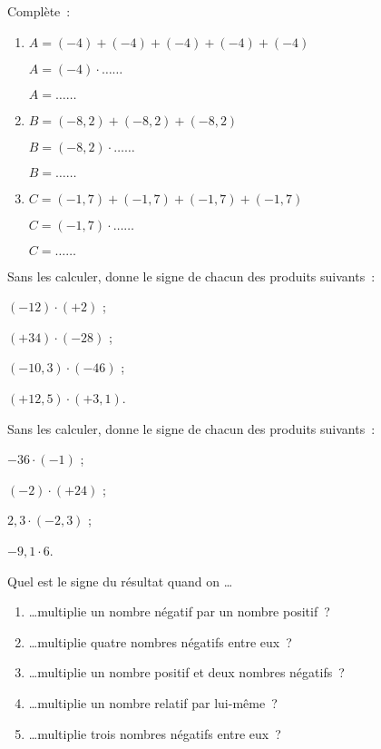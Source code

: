 

\begin{exercice}
Complète : 
\begin{enumerate}
 \item $A = (-4) + (-4) + (-4) + (-4) + (-4)$
 
$A = (-4) \cdot \ldots \ldots$

$A = \ldots \ldots$
 \item $B = (-8,2) + (-8,2) + (-8,2)$
 
$B = (-8,2) \cdot \ldots \ldots$

$B = \ldots \ldots$
 \item $C = (-1,7) + (-1,7) + (-1,7) + (-1,7)$

$C = (-1,7) \cdot \ldots \ldots$

$C = \ldots \ldots$
 \end{enumerate}
\end{exercice}


\begin{exercice}
Sans les calculer, donne le signe de chacun des produits suivants :
\begin{colenumerate}{2}
 \item $(-12) \cdot (+2)$ ;
 \item $(+34) \cdot (-28)$ ;
 \item $(-10,3) \cdot (-46)$ ;
 \item $(+12,5) \cdot (+3,1)$.
 \end{colenumerate}
\end{exercice}


\begin{exercice}
Sans les calculer, donne le signe de chacun des produits suivants :
\begin{colenumerate}{2}
 \item $-36 \cdot (-1)$ ;
 \item $(-2) \cdot (+24)$ ; 
 \item $2,3 \cdot (-2,3)$ ;
 \item $-9,1 \cdot 6$.
 \end{colenumerate}
\end{exercice}


\begin{exercice}
Quel est le signe du résultat quand on \ldots
\begin{enumerate}
 \item \ldots multiplie un nombre négatif par un nombre positif ?
 \item \ldots multiplie quatre nombres négatifs entre eux ?
 \item \ldots multiplie un nombre positif et deux nombres négatifs ?
 \item \ldots multiplie un nombre relatif par lui-même ?
 \item \ldots multiplie trois nombres négatifs entre eux ?
 \end{enumerate}
\end{exercice}


